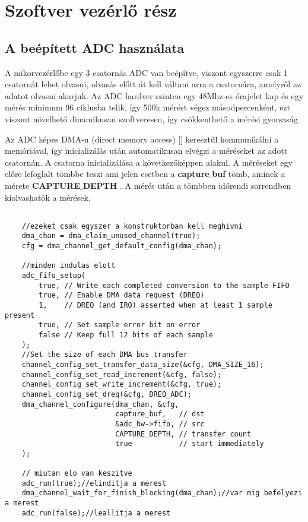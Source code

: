 \section{Szoftver vezérlő rész}

\subsection{A beépített ADC használata}

A mikorvezérlőbe egy 3 csatornás ADC van beépítve, viszont egyszerre csak 1 
csatornát lehet olvasni, olvasás előtt át kell váltani arra a csatornára, amelyről
az adatot olvasni akarjuk. Az ADC hardver szinten egy 48Mhz-es órajelet kap és
egy mérés minimum 96 ciklusba telik, így 500k mérést végez másodpercenként, 
ezt viszont növelhető dinamikusan szoftveresen, így csökkenthető a mérési gyorsaság.


Az ADC képes DMA-n (direct memory access) [\cite{DMA}] keresztül kommunikálni a 
memóriával, így inicializálás után automatikusan elvégzi a méréseket az adott
csatornán. A csatorna inicializálása a következőképpen alakul. A méréseket
egy előre lefoglalt tömbbe teszi ami jelen esetben a \textbf{capture$\_$buf} tömb,
aminek a mérete \textbf{CAPTURE$\_$DEPTH} . A mérés után a tömbben időrendi sorrendben
kiolvashatók a mérések.


\begin{lstlisting}

    //ezeket csak egyszer a konstruktorban kell meghivni
    dma_chan = dma_claim_unused_channel(true);
    cfg = dma_channel_get_default_config(dma_chan);

    //minden indulas elott
    adc_fifo_setup(
        true, // Write each completed conversion to the sample FIFO
        true, // Enable DMA data request (DREQ)
        1,    // DREQ (and IRQ) asserted when at least 1 sample present
        true, // Set sample error bit on error
        false // Keep full 12 bits of each sample
    );
    //Set the size of each DMA bus transfer
    channel_config_set_transfer_data_size(&cfg, DMA_SIZE_16);
    channel_config_set_read_increment(&cfg, false);
    channel_config_set_write_increment(&cfg, true);
    channel_config_set_dreq(&cfg, DREQ_ADC);
    dma_channel_configure(dma_chan, &cfg,
                          capture_buf,   // dst
                          &adc_hw->fifo, // src
                          CAPTURE_DEPTH, // transfer count
                          true           // start immediately
    );

    // miutan elo van keszitve
    adc_run(true);//elinditja a merest
    dma_channel_wait_for_finish_blocking(dma_chan);//var mig befelyezi a merest
    adc_run(false);//leallitja a merest

\end{lstlisting}

